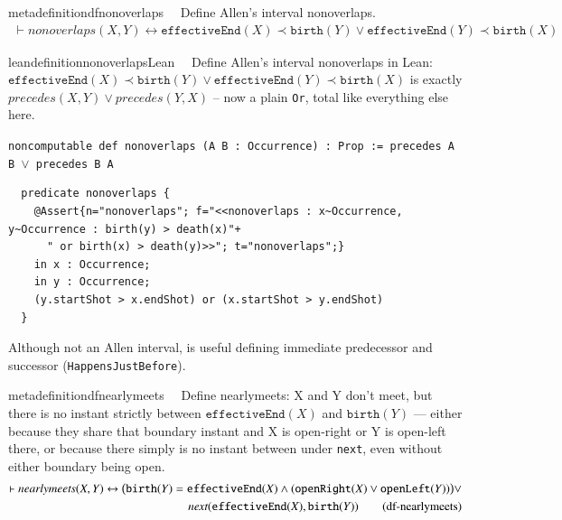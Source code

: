 \begin{restatable}{metadefinition}{dfnonoverlaps}~~ Define Allen's interval nonoverlaps.
\begin{align}
\vdash \textit{nonoverlaps}(X,Y) \leftrightarrow \texttt{effectiveEnd}(X) \prec \texttt{birth}(Y) \vee \texttt{effectiveEnd}(Y) \prec \texttt{birth}(X)
\label{eq:df-nonoverlaps}\tag{df-nonoverlaps}
\end{align}
\end{restatable}

\begin{restatable}{leandefinition}{nonoverlapsLean}~~ Define Allen's interval
nonoverlaps in Lean: $\texttt{effectiveEnd}(X) \prec \texttt{birth}(Y) \vee \texttt{effectiveEnd}(Y) \prec \texttt{birth}(X)$
is exactly $\textit{precedes}(X,Y) \vee \textit{precedes}(Y,X)$ -- now a plain \texttt{Or}, total like
everything else here.

\texttt{\textcolor{leancolor}{noncomputable def} \textcolor{leanyellow}{nonoverlaps} (A B : Occurrence) : Prop := precedes A B $\vee$ precedes B A}
\label{nonoverlaps}
\end{restatable}

\begin{lstlisting}
  predicate nonoverlaps {
    @Assert{n="nonoverlaps"; f="<<nonoverlaps : x~Occurrence, y~Occurrence : birth(y) > death(x)"+
      " or birth(x) > death(y)>>"; t="nonoverlaps";}
    in x : Occurrence;
    in y : Occurrence;
    (y.startShot > x.endShot) or (x.startShot > y.endShot)
  }
\end{lstlisting}

\pn Although not an Allen interval,  is useful defining immediate predecessor and successor (\texttt{Happens\-JustBefore}).

\begin{restatable}{metadefinition}{dfnearlymeets}~~ Define nearlymeets: X and Y don't
meet, but there is no instant strictly between $\texttt{effectiveEnd}(X)$ and $\texttt{birth}(Y)$ --- either
because they share that boundary instant and X is open-right or Y is open-left there, or because there simply
is no instant between under \texttt{next}, even without either boundary being open.
\begin{align}
\vdash \textit{nearlymeets}(X,Y) \leftrightarrow \big( \texttt{birth}(Y) = \texttt{effectiveEnd}(X) \wedge (
    \texttt{openRight}(X) \vee \texttt{openLeft}(Y) ) \big) \vee \notag \\
     \textit{next}(\texttt{effectiveEnd}(X),\texttt{birth}(Y))
\label{eq:df-nearlymeets}\tag{df-nearlymeets}
\end{align}
\end{restatable}



